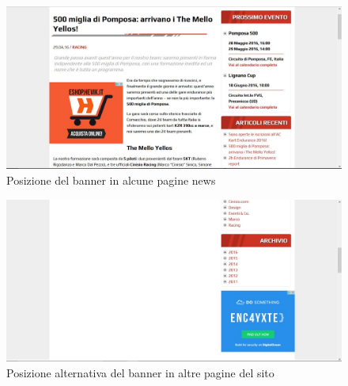 	\begin{figure} [h]
		\includegraphics[width=\textwidth]{images/OpsABannerInANew}
		\caption{Posizione del banner in alcune pagine news}
		\label{fig:New-Banner}
	\end{figure}	
	
	\begin{figure} [h]
		\includegraphics[width=\textwidth]{images/OpsAnotherBanner}
		\caption{Posizione alternativa del banner in altre pagine del sito}
		\label{fig:AnotherBanner}
	\end{figure}